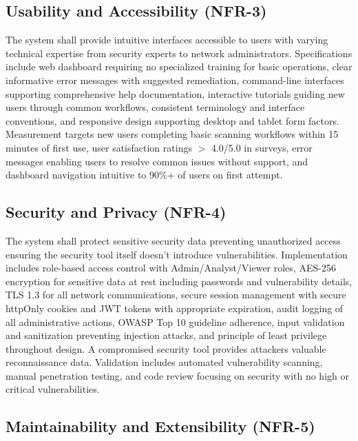 \subsection{Usability and Accessibility (NFR-3)}

The system shall provide intuitive interfaces accessible to users with varying technical expertise from security experts to network administrators. Specifications include web dashboard requiring no specialized training for basic operations, clear informative error messages with suggested remediation, command-line interfaces supporting comprehensive help documentation, interactive tutorials guiding new users through common workflows, consistent terminology and interface conventions, and responsive design supporting desktop and tablet form factors. Measurement targets new users completing basic scanning workflows within 15 minutes of first use, user satisfaction ratings $>$ 4.0/5.0 in surveys, error messages enabling users to resolve common issues without support, and dashboard navigation intuitive to 90\%+ of users on first attempt.

\subsection{Security and Privacy (NFR-4)}

The system shall protect sensitive security data preventing unauthorized access ensuring the security tool itself doesn't introduce vulnerabilities. Implementation includes role-based access control with Admin/Analyst/Viewer roles, AES-256 encryption for sensitive data at rest including passwords and vulnerability details, TLS 1.3 for all network communications, secure session management with secure httpOnly cookies and JWT tokens with appropriate expiration, audit logging of all administrative actions, OWASP Top 10 guideline adherence, input validation and sanitization preventing injection attacks, and principle of least privilege throughout design. A compromised security tool provides attackers valuable reconnaissance data. Validation includes automated vulnerability scanning, manual penetration testing, and code review focusing on security with no high or critical vulnerabilities.

\subsection{Maintainability and Extensibility (NFR-5)}


